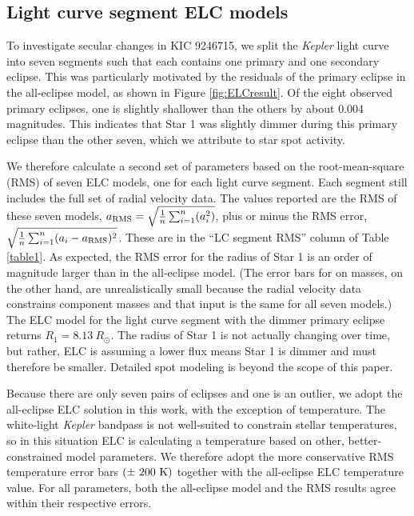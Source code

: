 \subsection{Light curve segment ELC models}\label{segment}
To investigate secular changes in KIC 9246715, we split the \emph{Kepler} light curve into seven segments such that each contains one primary and one secondary eclipse. This was particularly motivated by the residuals of the primary eclipse in the all-eclipse model, as shown in Figure \ref{fig:ELCresult}. Of the eight observed primary eclipses, one is slightly shallower than the others by about 0.004 magnitudes. This indicates that Star 1 was slightly dimmer during this primary eclipse than the other seven, which we attribute to star spot activity.

We therefore calculate a second set of parameters based on the root-mean-square (RMS) of seven ELC models, one for each light curve segment. Each segment still includes the full set of radial velocity data. The values reported are the RMS of these seven models, $a_{\rm{RMS}} = \sqrt{\frac{1}{n} \sum_{i=1}^n (a_i^2)}$, plus or minus the RMS error, $\sqrt{\frac{1}{n} \sum_{i=1}^n (a_i - a_{\rm{RMS}})^2}$. These are in the ``LC segment RMS'' column of Table \ref{table1}. As expected, the RMS error for the radius of Star 1 is an order of magnitude larger than in the all-eclipse model. (The error bars for on masses, on the other hand, are unrealistically small because the radial velocity data constrains component masses and that input is the same for all seven models.) The ELC model for the light curve segment with the dimmer primary eclipse returns $R_1 = 8.13 \ R_{\odot}$. The radius of Star 1 is not actually changing over time, but rather, ELC is assuming a lower flux means Star 1 is dimmer and must therefore be smaller. Detailed spot modeling is beyond the scope of this paper.

Because there are only seven pairs of eclipses and one is an outlier, we adopt the all-eclipse ELC solution in this work, with the exception of temperature. The white-light \emph{Kepler} bandpass is not well-suited to constrain stellar temperatures, so in this situation ELC is calculating a temperature based on other, better-constrained model parameters. We therefore adopt the more conservative RMS temperature error bars $(\pm ~200 \ \rm{K})$ together with the all-eclipse ELC temperature value. For all parameters, both the all-eclipse model and the RMS results agree within their respective errors.

  
  